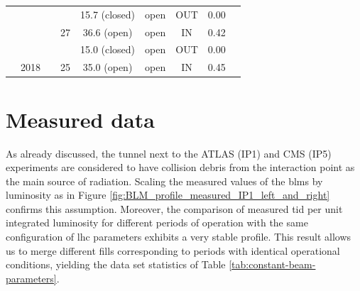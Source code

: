 \documentclass[encoding=utf8,british]{tumphthesis}
\begin{document}
\begin{table}[H]
\begin{tabular}{|c|c|c|l|c|l|c|l|r|}
\rowcolor[HTML]{EFEFEF} 
\cellcolor[HTML]{EFEFEF}                       & \cellcolor[HTML]{9FC5E8}                       & \multicolumn{1}{c|}{\cellcolor[HTML]{9FC5E8}}                       & \multicolumn{1}{c|}{\cellcolor[HTML]{9FC5E8}}                     & 15.7 (closed)                     & open                                & OUT                        & 0.00                          \\
\rowcolor[HTML]{9FC5E8} 
\cellcolor[HTML]{EFEFEF}                       & \cellcolor[HTML]{9FC5E8}                       & \multicolumn{1}{c|}{\cellcolor[HTML]{9FC5E8}}                       & \multicolumn{1}{c|}{\multirow{-2}{*}{\cellcolor[HTML]{9FC5E8}27}} & 36.6 (open)                       & open                                & IN                         & 0.42                          \\
\rowcolor[HTML]{EFEFEF} 
\cellcolor[HTML]{EFEFEF}                       & \cellcolor[HTML]{9FC5E8}                       &                                                                    & \cellcolor[HTML]{EFEFEF}                                         & 15.0 (closed)                     & open                                & OUT                        & 0.00                          \\
\rowcolor[HTML]{9FC5E8} 
\multirow{-14}{*}{\cellcolor[HTML]{EFEFEF}IR5} & \multirow{-6}{*}{\cellcolor[HTML]{9FC5E8}2018} & \cellcolor[HTML]{EFEFEF}                                           & \multirow{-2}{*}{\cellcolor[HTML]{EFEFEF}25}                     & 35.0 (open)                       & open                                & IN                         & 0.45                         \\ \hline
\end{tabular}
\end{table}


\newpage
\section{Measured data}
\label{LHC:measured-data}

As already discussed, the tunnel next to the ATLAS (IP1) and CMS (IP5) experiments are considered to have collision debris from the interaction point as the main source of radiation. Scaling the measured values of the \acrshort{blm}s by luminosity as in Figure \ref{fig:BLM_profile_measured_IP1_left_and_right} confirms this assumption. Moreover, the comparison of measured \acrshort{tid} per unit integrated luminosity for different periods of operation with the same configuration of \acrshort{lhc} parameters exhibits a very stable profile. This result allows us to merge different fills corresponding to periods with identical operational conditions, yielding the data set statistics of Table \ref{tab:constant-beam-parameters}. 
\end{document}
